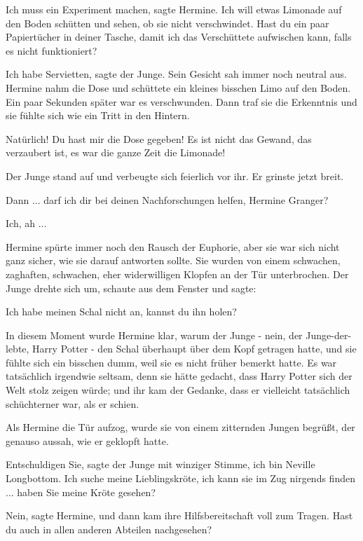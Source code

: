 \glqq{}Ich muss ein Experiment machen\grqq{}, sagte Hermine. \glqq{}Ich will etwas
Limonade auf den Boden schütten und sehen, ob sie nicht verschwindet. Hast du
ein paar Papiertücher in deiner Tasche, damit ich das Verschüttete aufwischen
kann, falls es nicht funktioniert?\grqq{}

\glqq{}Ich habe Servietten\grqq{}, sagte der Junge. Sein Gesicht sah immer noch
neutral aus. Hermine nahm die Dose und schüttete ein kleines bisschen Limo auf
den Boden. Ein paar Sekunden später war es verschwunden. Dann traf sie die
Erkenntnis und sie fühlte sich wie ein Tritt in den Hintern.

\glqq{}Natürlich! Du hast mir die Dose gegeben! Es ist nicht das Gewand, das
verzaubert ist, es war die ganze Zeit die Limonade!\grqq{}

Der Junge stand auf und verbeugte sich feierlich vor ihr. Er grinste jetzt
breit.

\glqq{}Dann ... darf ich dir bei deinen Nachforschungen helfen, Hermine
Granger?\grqq{}

\glqq{}Ich, ah ...\grqq{}

Hermine spürte immer noch den Rausch der Euphorie, aber sie war sich nicht ganz
sicher, wie sie darauf antworten sollte. Sie wurden von einem schwachen,
zaghaften, schwachen, eher widerwilligen Klopfen an der Tür unterbrochen. Der
Junge drehte sich um, schaute aus dem Fenster und sagte:

\glqq{}Ich habe meinen Schal nicht an, kannst du ihn holen?\grqq{}

In diesem Moment wurde Hermine klar, warum der Junge - nein, der
Junge-der-lebte, Harry Potter - den Schal überhaupt über dem Kopf getragen
hatte, und sie fühlte sich ein bisschen dumm, weil sie es nicht früher bemerkt
hatte. Es war tatsächlich irgendwie seltsam, denn sie hätte gedacht, dass Harry
Potter sich der Welt stolz zeigen würde; und ihr kam der Gedanke, dass er
vielleicht tatsächlich schüchterner war, als er schien.

Als Hermine die Tür aufzog, wurde sie von einem zitternden Jungen begrüßt, der
genauso aussah, wie er geklopft hatte.

\glqq{}Entschuldigen Sie\grqq{}, sagte der Junge mit winziger Stimme, \glqq{}ich
bin Neville Longbottom. Ich suche meine Lieblingskröte, ich kann sie im Zug
nirgends finden ... haben Sie meine Kröte gesehen?\grqq{}

\glqq{}Nein\grqq{}, sagte Hermine, und dann kam ihre Hilfsbereitschaft voll zum
Tragen. \glqq{}Hast du auch in allen anderen Abteilen nachgesehen?\grqq{}

